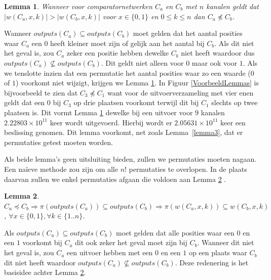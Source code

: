 \documentclass{article}
\newtheorem{lemma}{Lemma}
\begin{document}
\begin{lemma}
	Wanneer voor comparatornetwerken $C_a$ en $C_b$ met $n$ kanalen geldt dat $|w\left(C_a, x, k\right)| > |w\left(C_b, x, k\right)|$ voor $x \in \{0,1\}$ en $0 \leq k \leq n$ dan $C_a \npreceq C_b$.
	\label{lemma4}
\end{lemma}
Wanneer ${outputs(C_a) \subseteq outputs(C_b)}$ moet gelden dat het aantal posities waar $C_a$ een $0$ heeft kleiner moet zijn of gelijk aan het aantal bij $C_b$.
Als dit niet het geval is, zou $C_a$ zeker een positie hebben dewelke $C_b$ niet heeft waardoor dus ${outputs(C_a) \nsubseteq outputs(C_b)}$.
Dit geldt niet alleen voor $0$ maar ook voor $1$.
Als we tenslotte inzien dat een permutatie het aantal posities waar zo een waarde ($0$ of $1$) voorkomt niet wijzigt, krijgen we Lemma \ref{lemma4}.
In Figuur \ref{VoorbeeldLemmas} is bijvoorbeeld te zien dat $C_3 \npreceq C_1$ want voor de uitvoerverzameling met vier enen geldt dat een $0$ bij $C_3$ op drie plaatsen voorkomt terwijl dit bij $C_1$ slechts op twee plaatsen is.
Dit vormt Lemma \ref{lemma4} dewelke bij een uitvoer voor $9$ kanalen ${2.22803 \times 10^{11}}$ keer wordt uitgevoerd. Hierbij wordt er $2.05631 \times 10^{11}$ keer een beslissing genomen.
Dit lemma voorkomt, net zoals Lemma~\ref{lemma3}, dat er permutaties getest moeten worden.

Als beide lemma's geen uitsluiting bieden, zullen we permutaties moeten nagaan.
Een na\"ieve methode zou zijn om alle $n!$ permutaties te overlopen.
In de plaats daarvan zullen we enkel permutaties afgaan die voldoen aan Lemma \ref{lemma5} \cite{sortingNetworksSize2014}.
\begin{lemma}
	${C_a \preceq C_b  \Rightarrow \pi\left(outputs\left(C_{a}\right)\right) \subseteq outputs\left(C_{b}\right)} \Rightarrow \pi\left(w\left(C_a, x, k\right)\right) \subseteq w\left(C_b, x, k\right)$,
	${\forall x \in \{0,1\}, \forall k \in \{1..n\}}$.
\label{lemma5}
\end{lemma}

Als ${outputs(C_a) \subseteq outputs(C_b)}$ moet gelden dat alle posities waar een $0$ en een $1$ voorkomt bij $C_a$ dit ook zeker het geval moet zijn bij $C_b$.
Wanneer dit niet het geval is, zou $C_a$ een uitvoer hebben met een $0$ en een $1$ op een plaats waar $C_b$ dit niet heeft waardoor ${outputs(C_a) \nsubseteq outputs(C_b)}$.
Deze redenering is het basisidee achter Lemma \ref{lemma5}.
\end{document}
